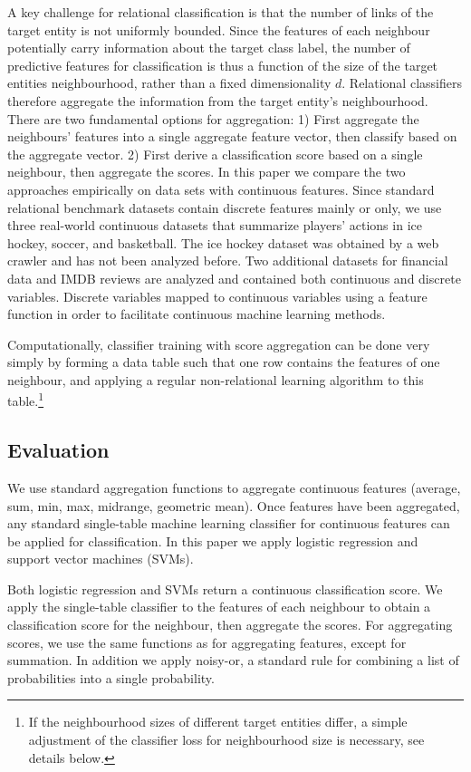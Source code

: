 \documentclass[conference]{IEEEtran}
\begin{document}
A key challenge for relational classification is that the number of links of the target entity is not uniformly bounded. Since the features of each neighbour potentially carry information about the target class label, the number of predictive features for classification is thus a function of the size of the target entities neighbourhood, rather than a fixed dimensionality $d$. Relational classifiers therefore aggregate the information from the target entity's neighbourhood. There are two fundamental options for aggregation: 1) First aggregate the neighbours' features into a single aggregate feature vector, then classify based on the aggregate vector. 2) First derive a classification score based on a single neighbour, then aggregate the scores.
%
In this paper we compare the two approaches empirically on data sets with continuous features. Since standard relational benchmark datasets contain discrete features mainly or only, we use three real-world continuous datasets that summarize players' actions in ice hockey, soccer, and basketball. The ice hockey dataset was obtained by a web crawler and has not been analyzed before. Two additional datasets for financial data and IMDB reviews are analyzed and contained both continuous and discrete variables. Discrete variables mapped to continuous variables using a feature function in order to facilitate continuous machine learning methods.

Computationally, classifier training with score aggregation can be done very simply by forming a data table such that one row contains the features of one neighbour, and applying a regular non-relational learning algorithm to this table.\footnote{If the neighbourhood sizes of different target entities differ, a simple adjustment of the classifier loss for neighbourhood size is necessary, see details below.}

\subsection{Evaluation}
We use standard aggregation functions to aggregate continuous features (average, sum, min, max, midrange, geometric mean). Once features have been aggregated, any standard single-table machine learning classifier for continuous features can be applied for classification. In this paper we apply logistic regression and support vector machines (SVMs).

Both logistic regression and SVMs return a continuous classification score. We apply the single-table classifier to the features of each neighbour to obtain a classification score for the neighbour, then aggregate the scores. For aggregating scores, we use the same functions as for aggregating features, except for summation. In addition we apply noisy-or, a standard rule for combining a list of probabilities into a single probability.
\end{document}
